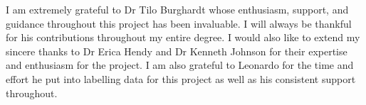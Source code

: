 I am extremely grateful to Dr Tilo Burghardt whose enthusiasm, support, and guidance throughout this project has been invaluable. I will always be thankful for his contributions throughout my entire degree. I would also like to extend my sincere thanks to Dr Erica Hendy and Dr Kenneth Johnson for their expertise and enthusiasm for the project. I am also grateful to Leonardo for the time and effort he put into labelling data for this project as well as his consistent support throughout.